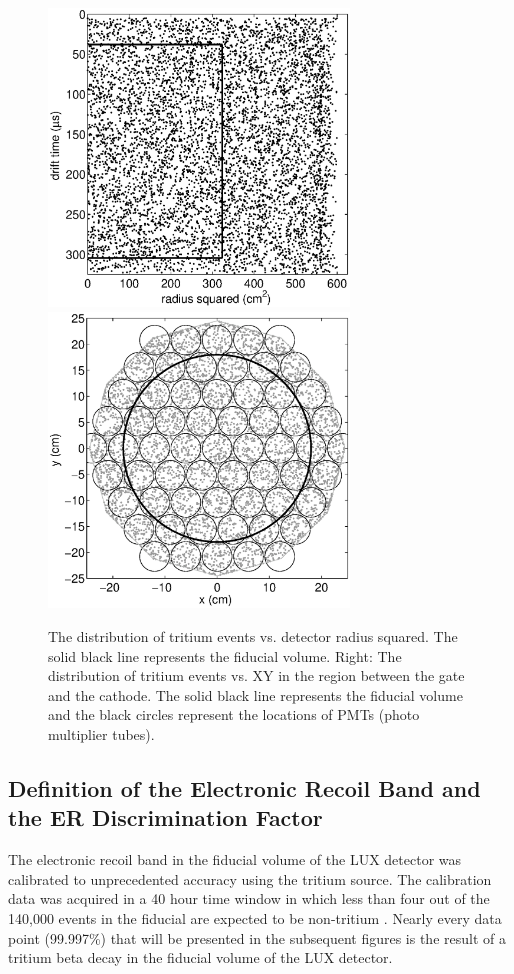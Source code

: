  \renewcommand{\baselinestretch}{1}
\small\normalsize
\begin{figure}[h!]\centering
\includegraphics[width=80mm]{Chapter_T/Figures/CH3T_RZ_scatter_lux10_20130812T1546.eps}
\includegraphics[width=80mm]{Chapter_T/Figures/CH3T_XY_scatter_PMT_lux10_20130812T1546.eps}
\caption{The distribution of tritium events vs. detector radius squared. The solid black line represents the fiducial volume.
 Right: The distribution of tritium events vs. XY in the region between the gate and the cathode. The solid black line represents the fiducial volume and the black circles represent the locations of PMTs (photo multiplier tubes).}
\label{fig:Density}
\end{figure}
\renewcommand{\baselinestretch}{2}
\small\normalsize

\subsection{Definition of the Electronic Recoil Band and the ER Discrimination Factor}
\label{sec:ER_Discrim}
The electronic recoil band in the fiducial volume of the LUX detector was calibrated to unprecedented accuracy using the tritium source. The calibration data was acquired in a 40 hour time window in which less than four out of the 140,000 events in the fiducial are expected to be non-tritium \cite{LUX_BG}.  Nearly every data point (99.997\%) that will be presented in the subsequent figures is the result of a tritium beta decay in the fiducial volume of the LUX detector. 

